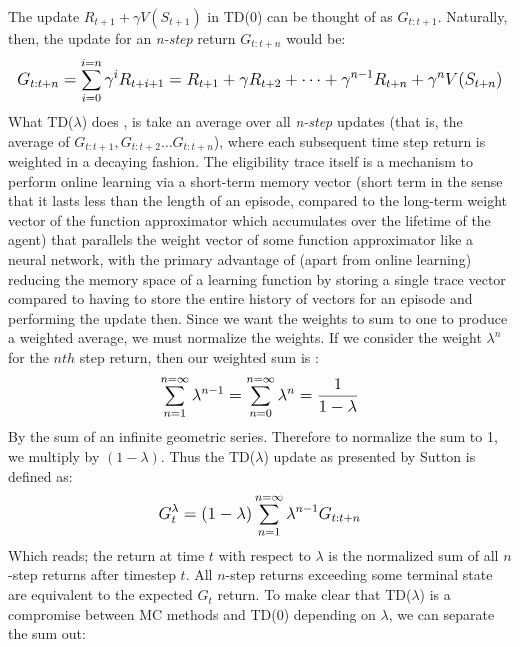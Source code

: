 \documentclass[12pt]{article}
\begin{document}
The update $R_{t+1} + \gamma V(S_{t+1})$ in TD(0) can be thought of as $G_{t:t+1}$. Naturally, then, the update for an \textit{n-step} return $G_{t:t+n}$ would be:
\begin{equation}
    \mathlarger{
        G_{t:t+n} = \sum\limits_{i=0}^{i=n}\gamma^iR_{t+i+1} = R_{t+1} + \gamma R_{t+2} + \dots + \gamma^{n-1}R_{t+n} + \gamma^nV(S_{t+n})
    }
\end{equation}
What TD($\lambda$) does \autocite{rlintrochap12,sutton1988learning}, is take an average over all \textit{n-step} updates (that is, the average of $G_{t:t+1}, G_{t:t+2} \dots G_{t:t+n}$), where each subsequent time step return is weighted in a decaying fashion. The eligibility trace itself is a mechanism to perform online learning via a short-term memory vector (short term in the sense that it lasts less than the length of an episode, compared to the long-term weight vector of the function approximator which accumulates over the lifetime of the agent) that parallels the weight vector of some function approximator like a neural network, with the primary advantage of (apart from online learning) reducing the memory space of a learning function by storing a single trace vector compared to having to store the entire history of vectors for an episode and performing the update then. Since we want the weights to sum to one to produce a weighted average, we must normalize the weights. If we consider the weight $\lambda^n$ for the $nth$ step return, then our weighted sum is : 
\begin{equation}
    \mathlarger{
        \sum\limits_{n=1}^{n=\infty}\lambda^{n-1} = \sum\limits_{n=0}^{n=\infty}\lambda^n = \frac{1}{1-\lambda}
        }
\end{equation}
By the sum of an infinite geometric series. Therefore to normalize the sum to 1, we multiply by $(1-\lambda)$. Thus the TD($\lambda$) update as presented by Sutton \autocite{rlintrochap12} is defined as: 
\begin{equation}
    \mathlarger{
        G^\lambda_t = (1 - \lambda)\sum\limits_{n=1}^{n=\infty}\lambda^{n-1}G_{t:t+n}
    }
\end{equation}
Which reads; the return at time $t$ with respect to $\lambda$ is the normalized sum of all $n$-step returns after timestep $t$. All $n$-step returns exceeding some terminal state are equivalent to the expected $G_t$ return. To make clear that TD($\lambda$) is a compromise between MC methods and TD(0) depending on $\lambda$, we can separate the sum out: 
\end{document}
